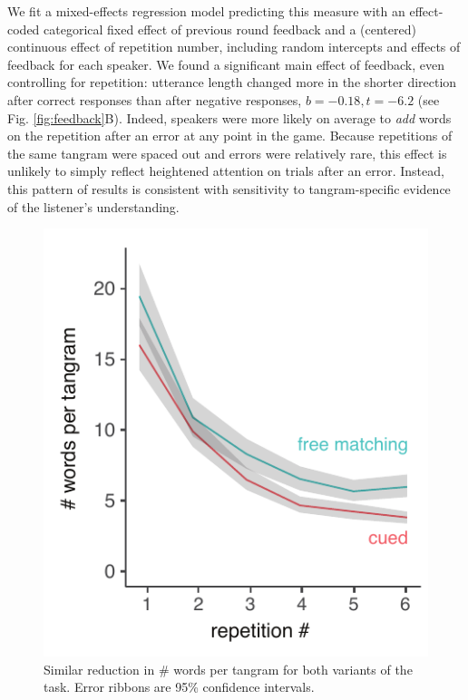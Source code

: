 \documentclass[alpha-refs]{wiley-article}
\begin{document}
We fit a mixed-effects regression model predicting this measure with an effect-coded categorical fixed effect of previous round feedback and a (centered) continuous effect of repetition number, including random intercepts and effects of feedback for each speaker.
We found a significant main effect of feedback, even controlling for repetition: utterance length changed more in the shorter direction after correct responses than after negative responses, $b = -0.18, t = -6.2$ (see Fig. \ref{fig:feedback}B).
Indeed, speakers were more likely on average to \emph{add} words on the repetition after an error at any point in the game.
Because repetitions of the same tangram were spaced out and errors were relatively rare, this effect is unlikely to simply reflect heightened attention on trials after an error.
Instead, this pattern of results is consistent with sensitivity to tangram-specific evidence of the listener's understanding.

\begin{figure}[t]
\centering
\includegraphics[scale=.8]{reduction.pdf}
\caption{Similar reduction in \# words per tangram for both variants of the task. Error ribbons are 95\% confidence intervals.} %
\label{fig:reduction}
\end{figure}
\end{document}
